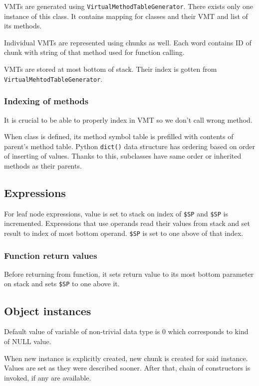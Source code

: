 \documentclass[a4paper, 11pt]{article}
\begin{document}
VMTs are generated using \texttt{VirtualMethodTableGenerator}. There exists only one instance of this class. It contains mapping for classes and their VMT and list of its methods. 

Individual VMTs are represented using chunks as well. Each word contains ID of chunk with string of that method used for function calling.

VMTs are stored at most bottom of stack. Their index is gotten from \texttt{VirtualMehtodTableGenerator}.

\subsubsection*{Indexing of methods}
It is crucial to be able to properly index in VMT so we don't call wrong method.

When class is defined, its method symbol table is prefilled with contents of parent's method table. Python \texttt{dict()} data structure has ordering based on order of inserting of values. Thanks to this, subclasses have same order or inherited methods as their parents.

\subsection*{Expressions}
For leaf node expressions, value is set to stack on index of \texttt{\$SP} and \texttt{\$SP} is incremented. Expressions that use operands read their values from stack and set result to index of most bottom operand. \texttt{\$SP} is set to one above of that index.

\subsubsection*{Function return values}
Before returning from function, it sets return value to its most bottom parameter on stack and sets \texttt{\$SP} to one above it.

\subsection*{Object instances}
Default value of variable of non-trivial data type is 0 which corresponds to kind of NULL value. 

When new instance is explicitly created, new chunk is created for said instance. Values are set as they were described sooner. After that, chain of constructors is invoked, if any are available.
\end{document}

